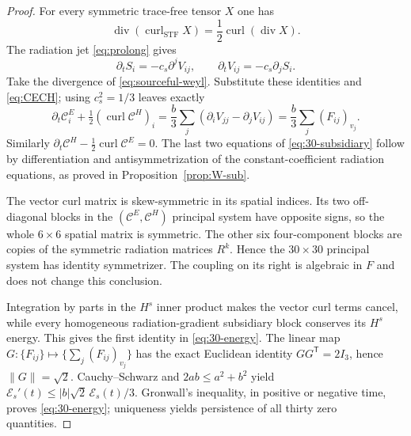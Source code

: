 \documentclass[11pt,a4paper]{article}
\begin{document}
\begin{proof}
For every symmetric trace-free
tensor $X$ one has
\[
\operatorname{div}
(\operatorname{curl}_{\mathrm{STF}}X)
=\frac12\operatorname{curl}
(\operatorname{div}X).
\]
The radiation jet
\eqref{eq:prolong} gives
\[
\partial_tS_i=-c_s\partial^jV_{ij},
\qquad
\partial_tV_{ij}=-c_s\partial_jS_i.
\]
Take the divergence of
\eqref{eq:sourceful-weyl}.
Substitute these identities and
\eqref{eq:CECH}; using
$c_s^2=1/3$ leaves exactly
\[
\partial_t\mathcal C^E_i+
\tfrac12(\operatorname{curl}\mathcal C^H)_i
=\frac b3\sum_j
(\partial_iV_{jj}-\partial_jV_{ij})
=\frac b3\sum_j(F_{ij})_{v_j}.
\]
Similarly
$\partial_t\mathcal C^H
-\tfrac12\operatorname{curl}\mathcal C^E=0$.
The last two equations of
\eqref{eq:30-subsidiary}
follow by differentiation
and antisymmetrization of
the constant-coefficient
radiation equations, as proved
in Proposition~\ref{prop:W-sub}.

The vector curl matrix is
skew-symmetric in its spatial
indices. Its two off-diagonal
blocks in the $(\mathcal C^E,
\mathcal C^H)$ principal
system have opposite signs,
so the whole $6\times6$
spatial matrix is symmetric.
The other six four-component
blocks are copies of the
symmetric radiation matrices
$R^k$. Hence the
$30\times30$ principal system
has identity symmetrizer.
The coupling on its right
is algebraic in $F$ and
does not change this conclusion.

Integration by parts in the
$H^s$ inner product makes
the vector curl terms cancel,
while every homogeneous
radiation-gradient subsidiary
block conserves its $H^s$
energy. This gives the first
identity in \eqref{eq:30-energy}.
The linear map
$G:\{F_{ij}\}\mapsto
\{\sum_j(F_{ij})_{v_j}\}$
has the exact Euclidean identity
$GG^{\mathsf T}=2I_3$,
hence $\|G\|=\sqrt2$.
Cauchy--Schwarz and
$2ab\le a^2+b^2$ yield
$\mathcal E_s'(t)
\le |b|\sqrt2\,\mathcal E_s(t)/3$.
Gronwall's inequality, in
positive or negative time,
proves \eqref{eq:30-energy};
uniqueness yields persistence
of all thirty zero quantities.
\end{proof}
\end{document}
